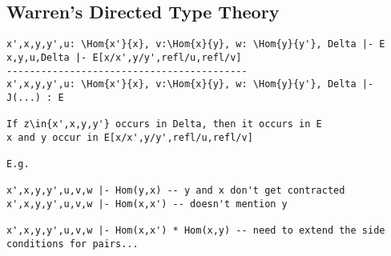 \documentclass[11pt]{article}
\theoremstyle{plain}
\begin{document}
\subsection{Warren's Directed Type Theory}

\begin{verbatim}
x',x,y,y',u: \Hom{x'}{x}, v:\Hom{x}{y}, w: \Hom{y}{y'}, Delta |- E
x,y,u,Delta |- E[x/x',y/y',refl/u,refl/v]
------------------------------------------
x',x,y,y',u: \Hom{x'}{x}, v:\Hom{x}{y}, w: \Hom{y}{y'}, Delta |- J(...) : E

If z\in{x',x,y,y'} occurs in Delta, then it occurs in E
x and y occur in E[x/x',y/y',refl/u,refl/v]

E.g. 

x',x,y,y',u,v,w |- Hom(y,x) -- y and x don't get contracted
x',x,y,y',u,v,w |- Hom(x,x') -- doesn't mention y

x',x,y,y',u,v,w |- Hom(x,x') * Hom(x,y) -- need to extend the side conditions for pairs...
\end{verbatim}


{ %


}
\end{document}
